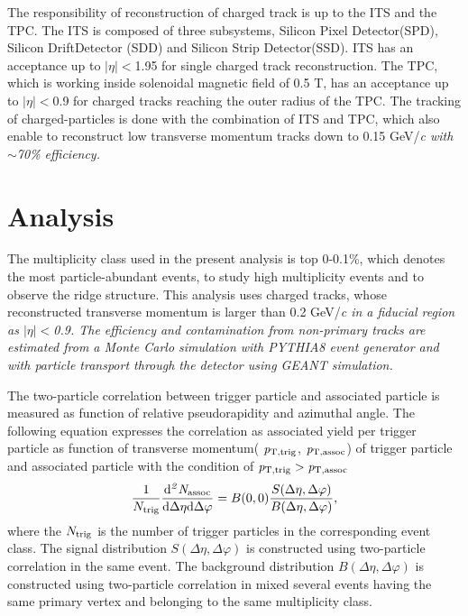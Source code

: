\documentclass[ALICE,manyauthors]{cernphprep}
\begin{document}
The responsibility of reconstruction of charged track is up to the ITS and the TPC. The ITS is composed of three subsystems, Silicon Pixel Detector(SPD), Silicon DriftDetector (SDD) and Silicon Strip Detector(SSD). ITS has an acceptance up to $|\eta|<$1.95 for single charged track reconstruction. The TPC, which is working inside solenoidal magnetic field of 0.5 T, has an acceptance up to $|\eta|<$0.9 for charged tracks reaching the outer radius of the TPC. The tracking of charged-particles is done with the combination of ITS and TPC, which also enable to reconstruct low transverse momentum tracks down to 0.15 GeV/\it{c}\rm{} with $\sim$70\% efficiency.


\section{Analysis}

The multiplicity class used in the present analysis is top 0-0.1\%, which denotes the most particle-abundant events, to study high multiplicity events and to observe the ridge structure. This analysis uses charged tracks, whose reconstructed transverse momentum is larger than 0.2 GeV/\it{c}\rm{} in a fiducial region as $|\eta|<$0.9. The efficiency and contamination from non-primary tracks are estimated from a Monte Carlo simulation with PYTHIA8 event generator and with particle transport through the detector using GEANT simulation.

The two-particle correlation between trigger particle and associated particle is measured as function of relative pseudorapidity and azimuthal angle. The following equation expresses the correlation as associated yield per trigger particle as function of transverse momentum( $\it{p}_{\rm{T, trig}}$, $\it{p}_{\rm{T, assoc}}$) of trigger particle and associated particle with the condition of $\it{p}_{\rm{T, trig}} > \it{p}_{\rm{T, assoc}}$
\begin{eqnarray}
\frac{1}{N_{\rm{trig}}} \frac{ \rm{d}\it{}^{2} N_{\rm{assoc}} }{ \rm{d}\Delta\eta \rm{d}\Delta\varphi} = B(0, 0)\frac{S(\Delta\eta, \Delta\varphi)}{B(\Delta\eta, \Delta\varphi)},
\end{eqnarray}
where the $N_{\rm{trig}}$ is the number of trigger particles in the corresponding event class. The signal distribution $S(\Delta\eta, \Delta\varphi)$ is constructed using two-particle correlation in the same event. The background distribution $B(\Delta\eta, \Delta\varphi)$ is constructed using two-particle correlation in mixed several events having the same primary vertex and belonging to the same multiplicity class.
\end{document}

